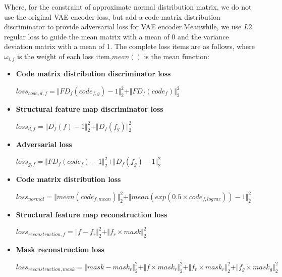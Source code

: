 \documentclass[letterpaper]{article} %
\begin{document}
Where, for the constraint of approximate normal distribution matrix, we do not use the original VAE encoder loss, but add a code matrix distribution discriminator to provide adversarial loss for VAE encoder.Meanwhile, we use $L2$ regular loss to guide the mean matrix with a mean of 0 and the variance deviation matrix with a mean of 1.
The complete loss items are as follows, where $\omega_{i,j}$ is the weight of each loss item,$mean()$ is the mean function: 
\begin{itemize}
	\item \textbf{Code matrix distribution discriminator loss} 
	\begin{center}
		$loss_{code,d,f}=\Vert{FD_f(code_{f,g})-1}\Vert_{2}^{2}+\Vert{FD_f(code_f)}\Vert_{2}^{2}$
	\end{center}
	
	\item \textbf{Structural feature map discriminator loss} 
	\begin{center}
		$loss_{d,f}=\Vert{D_f(f)-1}\Vert_{2}^{2}+\Vert{D_f(f_g )}\Vert_{2}^{2}$
	\end{center}
	
	\item \textbf{Adversarial loss} 
	\begin{center}
		$loss_{g,f}=\Vert{FD_f(code_f)-1}\Vert_{2}^{2}+\Vert{D_f(f_g)-1}\Vert_{2}^{2}$
	\end{center}
	
	\item \textbf{Code matrix distribution loss } 
	\begin{center}
		$loss_{normal}=\Vert{mean(code_{f,mean})}\Vert_{2}^{2}+ \Vert{mean(exp(0.5\times code_{f,logvar}))-1}\Vert_{2}^{2}$
	\end{center}
	
	\item \textbf{Structural feature map reconstruction loss} 
	\begin{center}
		$loss_{reconstruction,f}=\Vert{f-f_r}\Vert_{2}^{2}+\Vert{f_r\times mask}\Vert_{2}^{2}$
	\end{center}
	
	\item \textbf{Mask reconstruction loss}
	\begin{center}
		$loss_{reconstruction,mask}=\Vert{mask-mask_r }\Vert_{2}^{2}+\Vert{f\times mask_r}\Vert_{2}^{2}+\Vert{f_r\times mask_r}\Vert_{2}^{2}+\Vert{f_g\times mask_g}\Vert_{2}^{2}$
	\end{center}
\end{itemize}
\end{document}
